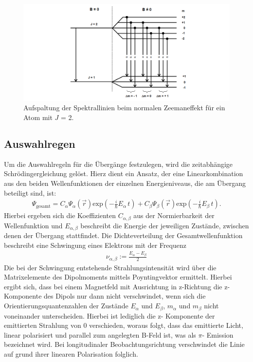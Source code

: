 \FloatBarrier
\begin{figure}
  \centering
  \includegraphics[scale=0.4]{normaler.PNG}
  \caption{Aufspaltung der Spektrallinien beim normalen Zeemaneffekt für ein Atom mit $J$ = 2. \cite{Q1}}
  \label{abb1}
\end{figure}
\FloatBarrier

\subsection{Auswahlregen}
Um die Auswahlregeln für die Übergänge festzulegen, wird die zeitabhängige Schrödingergleichung gelöst.
Hierz dient ein Ansatz, der eine Linearkombination aus den beiden Wellenfunktionen
der einzelnen Energieniveaus, die am Übergang beteiligt sind, ist:
\begin{align*}
    \Psi_{\text{gesamt}} = C_{\alpha} \Psi_{\alpha}(\vec{r}) \text{exp}\left( -\frac{i}{\hbar}E_{\alpha} \, t \right) + C_{\beta} \Psi_{\beta}(\vec{r}) \text{exp}\left( -\frac{i}{\hbar}E_{\beta} \, t \right).
\end{align*}
Hierbei ergeben sich die Koeffizienten $C_{\alpha, \beta}$ aus der Normierbarkeit der
Wellenfunktion und $E_{\alpha, \beta}$ beschreibt die Energie der jeweiligen Zustände,
zwischen denen der Übergang stattfindet.
Die Dichteverteilung der Gesamtwellenfunktion beschreibt eine Schwingung eines Elektrons
mit der Frequenz
\FloatBarrier
\begin{align*}
    \nu_{\alpha, \beta} := \frac{E_{\alpha}-E_{\beta}}{2}
\end{align*}
Die bei der Schwingung entstehende Strahlungsintensität wird über die Matrixelemente des Dipolmoments
mittels Poyntingvektor ermittelt. Hierbei ergibt sich, dass bei einem Magnetfeld mit Ausrichtung in z-Richtung
die z-Komponente des Dipols nur dann nicht verschwindet, wenn sich die Orientierungsquantenzahlen
der Zustände $E_{\alpha}$ und $E_{\beta}$, $m_{\alpha}$ und $m_{\beta}$ nicht
voneinander unterscheiden. Hierbei ist lediglich die z- Komponente der emittierten Strahlung von 0
verschieden, woraus folgt, dass das emittierte Licht, linear polarisiert und parallel zum
angelegten B-Feld ist, was als $\pi$- Emission bezeichnet wird. Bei longitudinaler Beobachtungsrichtung
verschwindet die Linie auf grund ihrer linearen Polarisation folglich.


